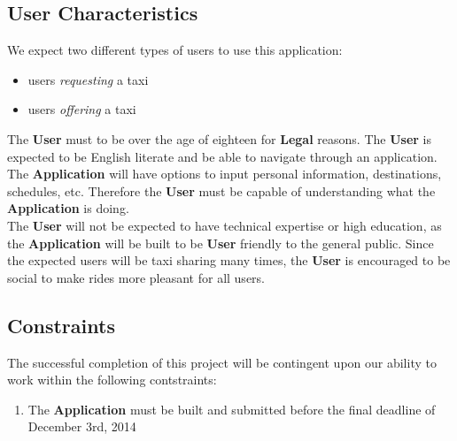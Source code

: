 \documentclass[english]{article}
\begin{document}
\subsection{User Characteristics}
\label{sub:user_characteristics}
We expect two different types of users to use this application: 
\begin{itemize}
    \item users \textit{requesting} a taxi
    \item users \textit{offering} a taxi
\end{itemize}
The \textbf{User} must to be over the age of eighteen for \textbf{Legal} reasons. The \textbf{User} is expected to be English literate and be able to navigate through an application. The \textbf{Application} will have options to input personal information, destinations, schedules, etc. Therefore the \textbf{User} must be capable of understanding what the \textbf{Application} is doing.
\\
\bigskip
The \textbf{User} will not be expected to have technical expertise or high education, as the \textbf{Application} will be built to be \textbf{User} friendly to the general public. Since the expected users will be taxi sharing many times, the \textbf{User} is encouraged to be social to make rides more pleasant for all users. 

\subsection{Constraints}
\label{sub:constraints}
The successful completion of this project will be contingent upon our ability to work within the following contstraints:
\begin{enumerate}
	\item The \textbf{Application} must be built and submitted before the final deadline of December 3rd, 2014
\end{enumerate}
\end{document}
